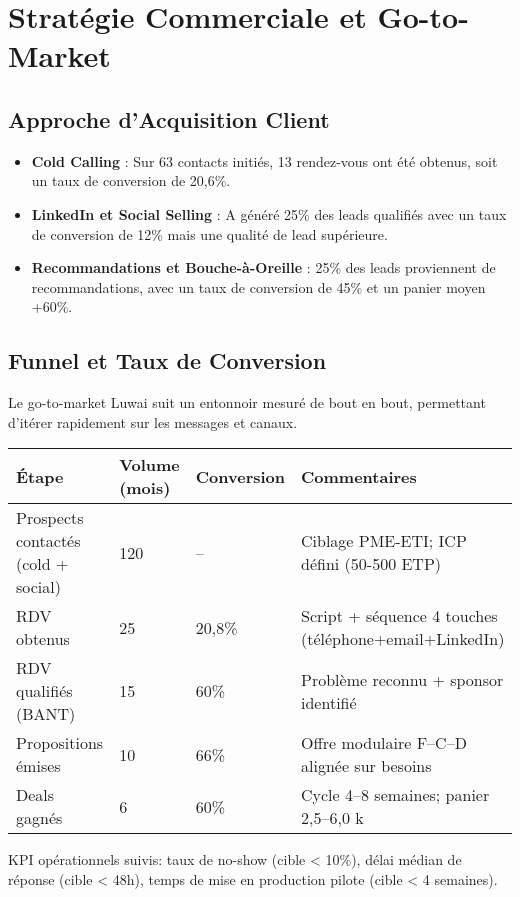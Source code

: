 \section{Stratégie Commerciale et Go-to-Market}

\subsection{Approche d'Acquisition Client}

\begin{itemize}
    \item \textbf{Cold Calling} : Sur 63 contacts initiés, 13 rendez-vous ont été obtenus, soit un taux de conversion de 20,6\%.
    \item \textbf{LinkedIn et Social Selling} : A généré 25\% des leads qualifiés avec un taux de conversion de 12\% mais une qualité de lead supérieure.
    \item \textbf{Recommandations et Bouche-à-Oreille} : 25\% des leads proviennent de recommandations, avec un taux de conversion de 45\% et un panier moyen +60\%.
\end{itemize}

\subsection{Funnel et Taux de Conversion}
Le go-to-market Luwai suit un entonnoir mesuré de bout en bout, permettant d'itérer rapidement sur les messages et canaux.
\begin{longtable}{@{}p{5cm}p{3cm}p{3cm}p{4cm}@{}}
\toprule
\textbf{Étape} & \textbf{Volume (mois)} & \textbf{Conversion} & \textbf{Commentaires} \\
\midrule
Prospects contactés (cold + social) & 120 & -- & Ciblage PME-ETI; ICP défini (50-500 ETP) \\
RDV obtenus & 25 & 20{,}8\% & Script + séquence 4 touches (téléphone+email+LinkedIn) \\
RDV qualifiés (BANT) & 15 & 60\% & Problème reconnu + sponsor identifié \\
Propositions émises & 10 & 66\% & Offre modulaire F–C–D alignée sur besoins \\
Deals gagnés & 6 & 60\% & Cycle 4–8 semaines; panier 2{,}5–6{,}0 k\,\texteuro{} \\
\bottomrule
\end{longtable}
KPI opérationnels suivis: taux de no-show (cible < 10\%), délai médian de réponse (cible < 48h), temps de mise en production pilote (cible \textless{} 4 semaines).

